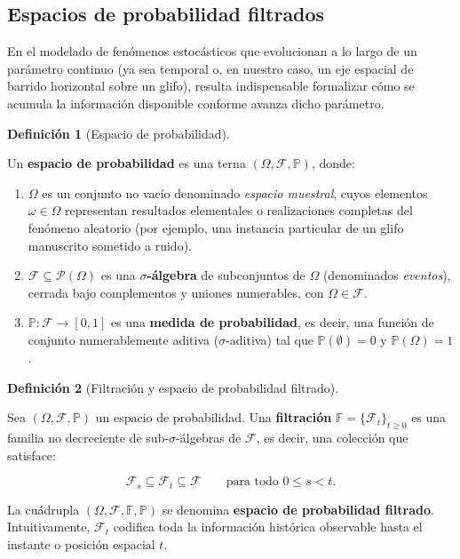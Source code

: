 \documentclass[
  spanish,
  us-letterpaper,
]{scrreprt}
\providecommand{\tightlist}{%
  \setlength{\itemsep}{0pt}\setlength{\parskip}{0pt}}
\theoremstyle{definition}
\newtheorem{definition}{Definición}[chapter]
\theoremstyle{remark}
\begin{document}
\subsection{Espacios de probabilidad
filtrados}\label{espacios-de-probabilidad-filtrados}

En el modelado de fenómenos estocásticos que evolucionan a lo largo de
un parámetro continuo (ya sea temporal o, en nuestro caso, un eje
espacial de barrido horizontal sobre un glifo), resulta indispensable
formalizar cómo se acumula la información disponible conforme avanza
dicho parámetro.

\begin{definition}[Espacio de
probabilidad]\protect\hypertarget{def-espacio-probabilidad}{}\label{def-espacio-probabilidad}

Un \textbf{espacio de probabilidad} es una terna
\((\Omega, \mathcal{F}, \mathbb{P})\), donde:

\begin{enumerate}
\def\labelenumi{\arabic{enumi}.}
\tightlist
\item
  \(\Omega\) es un conjunto no vacío denominado \emph{espacio muestral},
  cuyos elementos \(\omega \in \Omega\) representan resultados
  elementales o realizaciones completas del fenómeno aleatorio (por
  ejemplo, una instancia particular de un glifo manuscrito sometido a
  ruido).
\item
  \(\mathcal{F} \subseteq \mathcal{P}(\Omega)\) es una
  \textbf{\(\sigma\)-álgebra} de subconjuntos de \(\Omega\) (denominados
  \emph{eventos}), cerrada bajo complementos y uniones numerables, con
  \(\Omega \in \mathcal{F}\).
\item
  \(\mathbb{P}: \mathcal{F} \to [0, 1]\) es una \textbf{medida de
  probabilidad}, es decir, una función de conjunto numerablemente
  aditiva (\(\sigma\)-aditiva) tal que \(\mathbb{P}(\emptyset) = 0\) y
  \(\mathbb{P}(\Omega) = 1\).
\end{enumerate}

\end{definition}

\begin{definition}[Filtración y espacio de probabilidad
filtrado]\protect\hypertarget{def-espacio-filtrado}{}\label{def-espacio-filtrado}

Sea \((\Omega, \mathcal{F}, \mathbb{P})\) un espacio de probabilidad.
Una \textbf{filtración} \(\mathbb{F} = \{\mathcal{F}_t\}_{t \ge 0}\) es
una familia no decreciente de sub-\(\sigma\)-álgebras de
\(\mathcal{F}\), es decir, una colección que satisface:

\[
\mathcal{F}_s \subseteq \mathcal{F}_t \subseteq \mathcal{F} \qquad \text{para todo } 0 \le s < t.
\]

La cuádrupla \((\Omega, \mathcal{F}, \mathbb{F}, \mathbb{P})\) se
denomina \textbf{espacio de probabilidad filtrado}. Intuitivamente,
\(\mathcal{F}_t\) codifica toda la información histórica observable
hasta el instante o posición espacial \(t\).

\end{definition}
\end{document}
